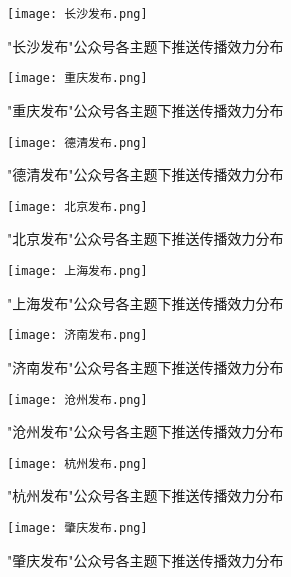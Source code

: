 
\begin{figure}
  \centering
  \texttt{[image: 长沙发布.png]}
  \caption{"长沙发布"公众号各主题下推送传播效力分布}
  \label{fig:长沙发布-box}
\end{figure}

\begin{figure}
  \centering
  \texttt{[image: 重庆发布.png]}
  \caption{"重庆发布"公众号各主题下推送传播效力分布}
  \label{fig:重庆发布-box}
\end{figure}

\begin{figure}
  \centering
  \texttt{[image: 德清发布.png]}
  \caption{"德清发布"公众号各主题下推送传播效力分布}
  \label{fig:德清发布-box}
\end{figure}

\begin{figure}
  \centering
  \texttt{[image: 北京发布.png]}
  \caption{"北京发布"公众号各主题下推送传播效力分布}
  \label{fig:北京发布-box}
\end{figure}

\begin{figure}
  \centering
  \texttt{[image: 上海发布.png]}
  \caption{"上海发布"公众号各主题下推送传播效力分布}
  \label{fig:上海发布-box}
\end{figure}

\begin{figure}
  \centering
  \texttt{[image: 济南发布.png]}
  \caption{"济南发布"公众号各主题下推送传播效力分布}
  \label{fig:济南发布-box}
\end{figure}

\begin{figure}
  \centering
  \texttt{[image: 沧州发布.png]}
  \caption{"沧州发布"公众号各主题下推送传播效力分布}
  \label{fig:沧州发布-box}
\end{figure}

\begin{figure}
  \centering
  \texttt{[image: 杭州发布.png]}
  \caption{"杭州发布"公众号各主题下推送传播效力分布}
  \label{fig:杭州发布-box}
\end{figure}

\begin{figure}
  \centering
  \texttt{[image: 肇庆发布.png]}
  \caption{"肇庆发布"公众号各主题下推送传播效力分布}
  \label{fig:肇庆发布-box}
\end{figure}

